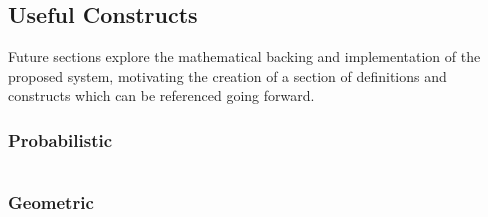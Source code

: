 \subsection{Useful Constructs}

Future sections explore the mathematical backing and implementation of the proposed system, motivating the creation of a section of definitions and constructs which can be referenced going forward.

\subsubsection{Probabilistic}

\textbf{$$}

\subsubsection{Geometric}
